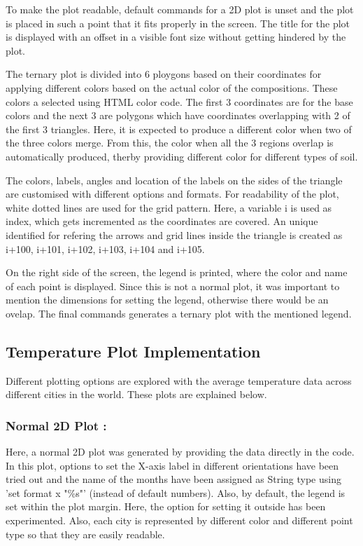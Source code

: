 \documentclass[runningheads]{llncs}
\begin{document}
To make the plot readable, default commands for a 2D plot is unset and the plot is placed in such a point that it fits properly in the screen. The title for the plot is displayed with an offset in a visible font size without getting hindered by the plot. 

The ternary plot is divided into 6 ploygons based on their coordinates for applying different colors based on the actual color of the compositions. These colors a selected using HTML color code. The first 3 coordinates are for the base colors and the next 3 are polygons which have coordinates overlapping with 2 of the first 3 triangles. Here, it is expected to produce a different color when two of the three colors merge. From this, the color when all the 3 regions overlap is automatically produced, therby providing different color for different types of soil.

The colors, labels, angles and location of the labels on the sides of the triangle are customised with different options and formats. For readability of the plot, white dotted lines are used for the grid pattern. Here, a variable i is used as index, which gets incremented as the coordinates are covered. An unique identified for refering the arrows and grid lines inside the triangle is created as i+100, i+101, i+102, i+103, i+104 and i+105.

On the right side of the screen, the legend is printed, where the color and name of each point is displayed. Since this is not a normal plot, it was important to mention the dimensions for setting the legend, otherwise there would be an ovelap. The final commands generates a ternary plot with the mentioned legend.


\subsection{Temperature Plot Implementation}
Different plotting options are explored with the average temperature data across different cities in the world. These plots are explained below.

\subsubsection{Normal 2D Plot : }
Here, a normal 2D plot was generated by providing the data directly in the code. In this plot, options to set the X-axis label in different orientations have been tried out and the name of the months have been assigned as String type using 'set format x "\%s"' (instead of default numbers). Also, by default, the legend is set within the plot margin. Here, the option for setting it outside has been experimented. Also, each city is represented by different color and different point type so that they are easily readable.
\end{document}
